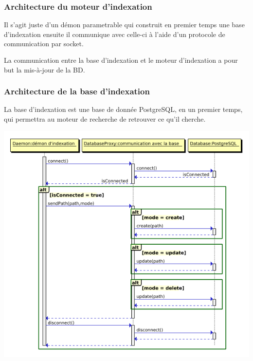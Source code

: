 \subsubsection{Architecture du moteur d'indexation}
Il s'agit juste d'un démon parametrable qui construit en premier temps une base d'indexation 
ensuite il communique avec celle-ci à l'aide d'un protocole de communication par socket.

La communication entre la base d'indexation et le moteur d'indexation a pour but la mis-à-jour de la BD.

\subsubsection{Architecture de la base d'indexation}
La base d'indexation est une base de donnée PostgreSQL, en un premier temps, qui permettra au moteur de recherche 
de retrouver ce qu'il cherche.

\begin{center}
\includegraphics[scale=0.5]{seqdbi.png}
\end{center}

